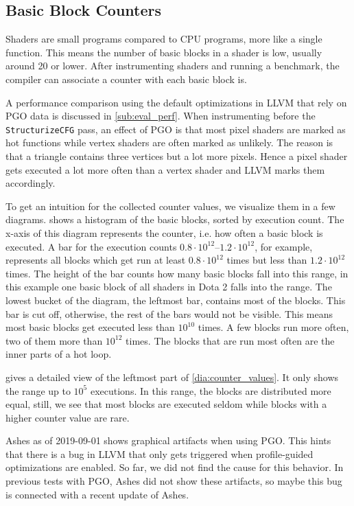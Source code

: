 \subsection{Basic Block Counters}
\label{sub:eval_counters}
Shaders are small programs compared to CPU programs, more like a single function.
This means the number of basic blocks in a shader is low, usually around 20 or lower.
After instrumenting shaders and running a benchmark, the compiler can associate a counter with each basic block is.

A performance comparison using the default optimizations in LLVM that rely on PGO data is discussed in \cref{sub:eval_perf}.
When instrumenting before the \texttt{StructurizeCFG} pass, an effect of PGO is that most pixel shaders are marked as hot functions while vertex shaders are often marked as unlikely.
The reason is that a triangle contains three vertices but a lot more pixels.
Hence a pixel shader gets executed a lot more often than a vertex shader and LLVM marks them accordingly.

To get an intuition for the collected counter values, we visualize them in a few diagrams.
 shows a histogram of the basic blocks, sorted by execution count.
The x-axis of this diagram represents the counter, i.e. how often a basic block is executed.
A bar for the execution counts $0.8\cdot 10^{12}$--$1.2\cdot 10^{12}$, for example, represents all blocks which get run at least $0.8\cdot 10^{12}$ times but less than $1.2\cdot 10^{12}$ times.
The height of the bar counts how many basic blocks fall into this range, in this example one basic block of all shaders in Dota 2 falls into the range.
The lowest bucket of the diagram, the leftmost bar, contains most of the blocks.
This bar is cut off, otherwise, the rest of the bars would not be visible.
This means most basic blocks get executed less than $10^{10}$ times.
A few blocks run more often, two of them more than $10^{12}$ times.
The blocks that are run most often are the inner parts of a hot loop.


 gives a detailed view of the leftmost part of \cref{dia:counter_values}.
It only shows the range up to $10^5$ executions.
In this range, the blocks are distributed more equal, still, we see that most blocks are executed seldom while blocks with a higher counter value are rare.


Ashes as of 2019-09-01 shows graphical artifacts when using PGO.
This hints that there is a bug in LLVM that only gets triggered when profile-guided optimizations are enabled.
So far, we did not find the cause for this behavior.
In previous tests with PGO, Ashes did not show these artifacts, so maybe this bug is connected with a recent update of Ashes.

